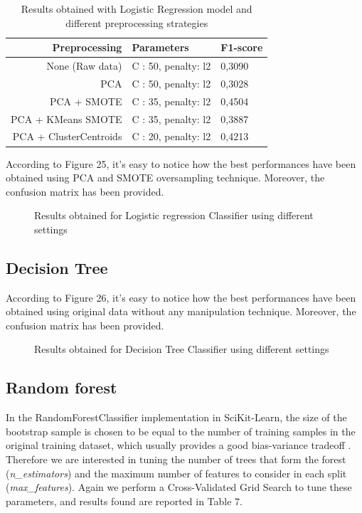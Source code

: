 \documentclass{article}
\begin{document}
\begin{table}[h]
\centering
\begin{tabular}{rll}
\textbf{Preprocessing} & \textbf{Parameters} & \textbf{F1-score} \\ \hline
None (Raw data)        & C : 50, penalty: l2 & 0,3090           \\
PCA                    & C : 50, penalty: l2 & 0,3028           \\
PCA + SMOTE            & C : 35, penalty: l2 & 0,4504           \\
PCA + KMeans SMOTE     & C : 35, penalty: l2 & 0,3887           \\
PCA + ClusterCentroids & C : 20, penalty: l2 & 0,4213          
\end{tabular}
\caption{Results obtained with Logistic Regression model and different preprocessing strategies}
\end{table}

According to Figure 25, it’s easy to notice how the best performances have been obtained using PCA and SMOTE oversampling technique. Moreover, the confusion matrix has been provided.

\begin{figure}[H]
\centering

\caption{Results obtained for Logistic regression Classifier using different settings}
\end{figure}

\subsection{Decision Tree}

According to Figure 26, it’s easy to notice how the best performances have been obtained using original data without any manipulation technique. Moreover, the confusion matrix has been provided.

\begin{figure}[H]
\centering

\caption{Results obtained for Decision Tree Classifier using different settings}
\end{figure}

\subsection{Random forest}
In the RandomForestClassifier implementation in SciKit-Learn, the size of the bootstrap sample is chosen to be equal to the number of training samples in the original training dataset, which usually provides a good bias-variance tradeoff \cite{quattro}. Therefore we are interested in tuning the number of trees that form the forest (\textit{n\_estimators}) and the maximum number of features to consider in each split (\textit{max\_features}). Again we perform a Cross-Validated Grid Search to tune these parameters, and results found are reported in Table 7.
\end{document}
